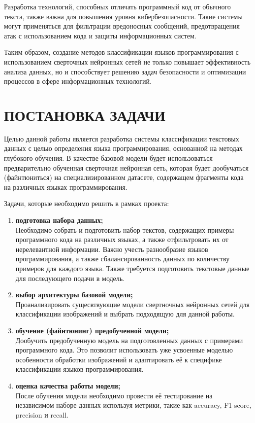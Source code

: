 {{        Разработка технологий, способных отличать программный код от обычного текста, также важна для повышения уровня кибербезопасности. Такие системы могут применяться для фильтрации вредоносных сообщений, предотвращения атак с использованием кода и защиты информационных систем.
        
        Таким образом, создание методов классификации языков программирования с использованием сверточных нейронных сетей не только повышает эффективность анализа данных, но и способствует решению задач безопасности и оптимизации процессов в сфере информационных технологий.
    }
    \newpage

\newpage
\section{\MakeUppercase{Постановка задачи}}

Целью данной работы является разработка системы классификации текстовых данных с целью определения языка программирования, основанной на методах глубокого обучения. В качестве базовой модели будет использоваться предварительно обученная сверточная нейронная сеть, которая будет дообучаться (файнтюниться) на специализированном датасете, содержащем фрагменты кода на различных языках программирования.

Задачи, которые необходимо решить в рамках проекта:
\begin{enumerate}
    \item \textbf{подготовка набора данных;} \\
    Необходимо собрать и подготовить набор текстов, содержащих примеры программного кода на различных языках, а также отфильтровать их от нерелевантной информации. Важно учесть разнообразие языков программирования, а также сбалансированность данных по количеству примеров для каждого языка. Также требуется подготовить текстовые данные для последующего подачи в модель. 
    \item \textbf{выбор архитектуры базовой модели;} \\
    Проанализировать сущесвтвующие модели свертночных нейронных сетей для классификации изображений и выбрать подходящую для данной работы.
    \item \textbf{обучение (файнтюнинг) предобученной модели;} \\
    Дообучить предобученную модель на подготовленных данных с примерами программного кода. Это позволит использовать уже усвоенные моделью особенности обработки изображений и адаптировать её к специфике классификации языков программирования.
    \item \textbf{оценка качества работы модели;} \\
    После обучения модели необходимо провести её тестирование на независимом наборе данных используя метрики, такие как accuracy, F1-score, precision и recall. 
\end{enumerate}

}
